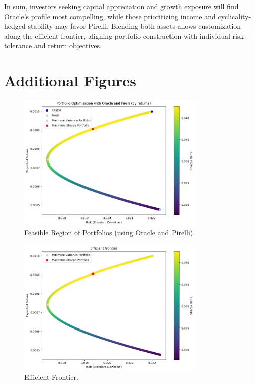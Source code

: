 \documentclass[12pt,a4paper]{report}
\begin{document}
In sum, investors seeking capital appreciation and growth exposure will find Oracle’s profile most compelling, while those prioritizing income and cyclicality-hedged stability may favor Pirelli.  Blending both assets allows customization along the efficient frontier, aligning portfolio construction with individual risk-tolerance and return objectives.

\newpage
\appendix
\chapter{Additional Figures}
\begin{figure}[!htbp]
  \centering
  \includegraphics[width=0.8\textwidth]{feasible-region.png}
  \caption{Feasible Region of Portfolios (using Oracle and Pirelli).}
  \label{fig:appendix-feasible-region}
\end{figure}

\begin{figure}[!htbp]
  \centering
  \includegraphics[width=0.8\textwidth]{efficient-frontier.png}
  \caption{Efficient Frontier.}
  \label{fig:appendix-efficient-frontier}
\end{figure}
\end{document}
